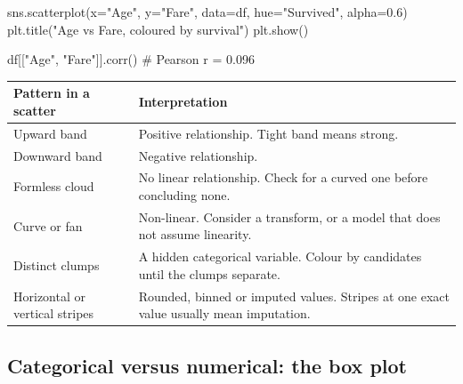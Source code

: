 \documentclass[11pt,a4paper]{article}
\begin{document}
\begin{py}
sns.scatterplot(x="Age", y="Fare", data=df, hue="Survived", alpha=0.6)
plt.title("Age vs Fare, coloured by survival")
plt.show()

df[["Age", "Fare"]].corr()          # Pearson r = 0.096
\end{py}



\begin{tabularx}{\textwidth}{@{}l X@{}}
\toprule
\rowcolor{tablehead} \textbf{Pattern in a scatter} & \textbf{Interpretation} \\
\midrule
Upward band & Positive relationship. Tight band means strong. \\
Downward band & Negative relationship. \\
Formless cloud & No linear relationship. Check for a curved one before concluding none. \\
Curve or fan & Non-linear. Consider a transform, or a model that does not assume linearity. \\
Distinct clumps & A hidden categorical variable. Colour by candidates until the clumps separate. \\
Horizontal or vertical stripes & Rounded, binned or imputed values. Stripes at one exact value usually mean imputation. \\
\bottomrule
\end{tabularx}


\subsection{Categorical versus numerical: the box plot}
\end{document}
